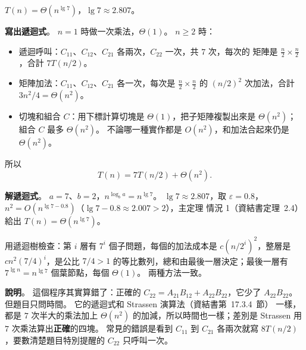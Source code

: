 \begin{pastsoln}
$T(n) = \Theta(n^{\lg 7})$，$\lg 7 \approx 2.807$。

\textbf{寫出遞迴式}。 $n = 1$ 時做一次乘法，$\Theta(1)$。 $n \ge 2$ 時：
\begin{itemize}
\item 遞迴呼叫：$C_{11}$、$C_{12}$、$C_{21}$ 各兩次，$C_{22}$ 一次，共 $7$ 次，每次的
矩陣是 $\frac{n}{2} \times \frac{n}{2}$，合計 $7T(n/2)$。
\item 矩陣加法：$C_{11}$、$C_{12}$、$C_{21}$ 各一次，每次是 $\frac{n}{2} \times \frac{n}{2}$
的 $(n/2)^2$ 次加法，合計 $3n^2/4 = \Theta(n^2)$。
\item 切塊和組合 $C$：用下標計算切塊是 $\Theta(1)$，把子矩陣複製出來是 $\Theta(n^2)$；
組合 $C$ 最多 $\Theta(n^2)$。 不論哪一種實作都是 $O(n^2)$，和加法合起來仍是
$\Theta(n^2)$。
\end{itemize}
所以
\[
T(n) = 7T(n/2) + \Theta(n^2).
\]

\textbf{解遞迴式}。 $a = 7$、$b = 2$，$n^{\log_b a} = n^{\lg 7}$。 $\lg 7 \approx 2.807$，取
$\varepsilon = 0.8$，$n^2 = O(n^{\lg 7 - 0.8})$（$\lg 7 - 0.8 \approx 2.007 > 2$），主定理
情況 1（資結書定理~2.4）給出 $T(n) = \Theta(n^{\lg 7})$。

用遞迴樹檢查：第 $i$ 層有 $7^i$ 個子問題，每個的加法成本是 $c(n/2^i)^2$，整層是
$cn^2 (7/4)^i$，是公比 $7/4 > 1$ 的等比數列，總和由最後一層決定；最後一層有
$7^{\lg n} = n^{\lg 7}$ 個葉節點，每個 $\Theta(1)$。 兩種方法一致。

\textbf{說明}。 這個程序其實算錯了：正確的 $C_{22} = A_{21}B_{12} + A_{22}B_{22}$，它少了
$A_{22}B_{22}$。 但題目只問時間。 它的遞迴式和 Strassen 演算法（資結書第~17.3.4~節）
一樣，都是 $7$ 次半大的乘法加上 $\Theta(n^2)$ 的加減，所以時間也一樣；差別是 Strassen
用 $7$ 次乘法算出\textbf{正確}的四塊。 常見的錯誤是看到 $C_{11}$ 到 $C_{21}$ 各兩次就寫
$8T(n/2)$，要數清楚題目特別提醒的 $C_{22}$ 只呼叫一次。
\end{pastsoln}
